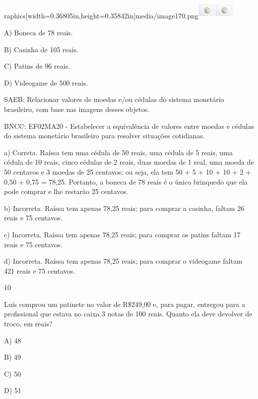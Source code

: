 \begin{escolha}
\begin{escolha}
{{{{raphics[width=0.36805in,height=0.35842in]{media/image170.png}\includegraphics[width=0.36805in,height=0.35842in]{media/image170.png}\includegraphics[width=0.36805in,height=0.35842in]{media/image170.png}

A) Boneca de 78 reais.

B) Casinha de 105 reais.

C) Patins de 96 reais.

D) Videogame de 500 reais.

SAEB: Relacionar valores de moedas e/ou cédulas do sistema
monetário brasileiro, com base nas imagens desses objetos.

BNCC: EF02MA20 - Estabelecer a equivalência de valores entre moedas e
cédulas do sistema monetário brasileiro para resolver situações
cotidianas.

a) Correta. Raíssa tem uma cédula de 50 reais, uma cédula de 5 reais,
uma cédula de 10 reais, cinco cédulas de 2 reais, duas moedas de 1 real,
uma moeda de 50 centavos e 3 moedas de 25 centavos; ou seja, ela tem 50
+ 5 + 10 + 10 + 2 + 0,50 + 0,75 = 78,25. Portanto, a boneca de 78 reais
é o único brinquedo que ela pode comprar e lhe restarão 25 centavos.

b) Incorreta. Raíssa tem apenas 78,25 reais; para comprar a casinha,
faltam 26 reais e 75 centavos.

c) Incorreta. Raíssa tem apenas 78,25 reais; para comprar os patins
faltam 17 reais e 75 centavos.

d) Incorreta. Raíssa tem apenas 78,25 reais; para comprar o videogame
faltam 421 reais e 75 centavos.

\num{10}

Luís comprou um patinete no valor de R\$249,00 e, para pagar, entregou
para a profissional que estava no caixa 3 notas de 100 reais. Quanto ela deve devolver de troco, em reais?

A) 48

B) 49

C) 50

D) 51

}}}}
\end{escolha}
\end{escolha}
